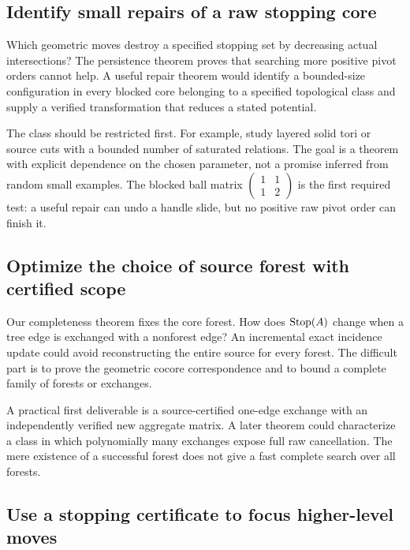 \subsection{Identify small repairs of a raw stopping core}

Which geometric moves destroy a specified stopping set by decreasing
actual intersections? The persistence theorem proves that searching more
positive pivot orders cannot help. A useful repair theorem would identify
a bounded-size configuration in every blocked core belonging to a
specified topological class and supply a verified transformation that
reduces a stated potential.

The class should be restricted first. For example, study layered solid
tori or source cuts with a bounded number of saturated relations. The
goal is a theorem with explicit dependence on the chosen parameter,
not a promise inferred from random small examples. The blocked ball
matrix $\left(\begin{smallmatrix}1&1\\1&2\end{smallmatrix}\right)$ is the
first required test: a useful repair can undo a handle slide, but no
positive raw pivot order can finish it.

\subsection{Optimize the choice of source forest with certified scope}

Our completeness theorem fixes the core forest. How does
$\operatorname{Stop}(A)$ change when a tree edge is exchanged with a nonforest edge?
An incremental exact incidence update could avoid reconstructing the
entire source for every forest. The difficult part is to prove the
geometric cocore correspondence and to bound a complete family of
forests or exchanges.

A practical first deliverable is a source-certified one-edge exchange
with an independently verified new aggregate matrix. A later theorem
could characterize a class in which polynomially many exchanges expose
full raw cancellation. The mere existence of a successful forest does
not give a fast complete search over all forests.

\subsection{Use a stopping certificate to focus higher-level moves}

